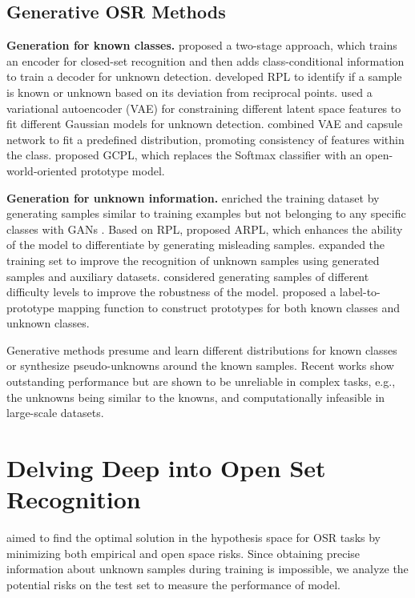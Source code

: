 \documentclass[letterpaper]{article} %
\begin{document}
\subsection{Generative OSR Methods}
\textbf{Generation for known classes.}
\cite{oza2019c2ae} proposed a two-stage approach, which trains an encoder for closed-set recognition and then adds class-conditional information to train a decoder for unknown detection. \cite{chen2020learning} developed RPL to identify if a sample is known or unknown based on its deviation from reciprocal points. \cite{sun2020open} used a variational autoencoder (VAE) for constraining different latent space features to fit different Gaussian models for unknown detection. \cite{guo2021conditional} combined VAE and capsule network to fit a predefined distribution, promoting consistency of features within the class. \cite{yang2022convolutional} proposed GCPL, which replaces the Softmax classifier with an open-world-oriented prototype model. 


\noindent\textbf{Generation for unknown information.}
\cite{neal2018open} enriched the training dataset by generating samples similar to training examples but not belonging to any specific classes with GANs \cite{ian2014gan}. Based on RPL, \cite{chen2022adversarial} proposed ARPL, which enhances the ability of the model to differentiate by generating misleading samples. \cite{kong2022opengan} expanded the training set to improve the recognition of unknown samples using generated samples and auxiliary datasets. \cite{moon2022difficulty} considered generating samples of different difficulty levels to improve the robustness of the model. \cite{liu2023opentext} proposed a label-to-prototype mapping function to construct prototypes for both known classes and unknown classes.


Generative methods presume and learn different distributions for known classes or synthesize pseudo-unknowns around the known samples. Recent works show outstanding performance but are shown to be unreliable in complex tasks, e.g., the unknowns being similar to the knowns, and computationally infeasible in large-scale datasets.

\section{Delving Deep into Open Set Recognition}
\cite{scheirer2013open} aimed to find the optimal solution in the hypothesis space for OSR tasks by minimizing both empirical and open space risks. Since obtaining precise information about unknown samples during training is impossible, we analyze the potential risks on the test set to measure the performance of model. 
\end{document}
